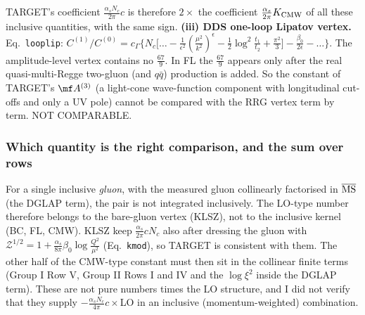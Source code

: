 TARGET's coefficient $\frac{\alpha_{s}N_{c}}{2\pi}c$ is therefore $2\times$ the coefficient $\frac{\alpha_{s}}{2\pi}K_{\rm CMW}$ of all these inclusive quantities, with the same sign.
\noindent\textbf{(iii) DDS one-loop Lipatov vertex.} Eq.~\texttt{looplip}: $C^{(1)}/C^{(0)}=c_{\Gamma}\big\{N_{c}\big[\dots-\frac{1}{\epsilon^{2}}(\frac{\mu^{2}}{k^{2}})^{\epsilon}-\frac12\log^{2}\frac{t_{1}}{t_{2}}+\frac{\pi^{2}}{3}\big]-\frac{\beta_{0}}{2\epsilon}-\dots\big\}$. The amplitude-level vertex contains no $\frac{67}{9}$. In FL the $\frac{67}{9}$ appears only after the real quasi-multi-Regge two-gluon (and $q\bar q$) production is added. So the constant of TARGET's $\mf A^{(3)}$ (a light-cone wave-function component with longitudinal cut-offs and only a UV pole) cannot be compared with the RRG vertex term by term. NOT COMPARABLE.

\subsubsection{Which quantity is the right comparison, and the sum over rows}
For a single inclusive \emph{gluon}, with the measured gluon collinearly factorised in $\overline{\rm MS}$ (the DGLAP term), the pair is not integrated inclusively. The LO-type number therefore belongs to the bare-gluon vertex (KLSZ), not to the inclusive kernel (BC, FL, CMW). KLSZ keep $\frac{\alpha_{s}}{2\pi}cN_{c}$ also after dressing the gluon with $\mathcal Z^{1/2}=1+\frac{\alpha_{s}}{8\pi}\beta_{0}\log\frac{Q^{2}}{\mu^{2}}$ (Eq.~\texttt{kmod}), so TARGET is consistent with them. The other half of the CMW-type constant must then sit in the collinear finite terms (Group I Row V, Group II Rows I and IV and the $\log\xi^{2}$ inside the DGLAP term). These are not pure numbers times the LO structure, and I did not verify that they supply $-\frac{\alpha_{s}N_{c}}{4\pi}c\times$LO in an inclusive (momentum-weighted) combination.

